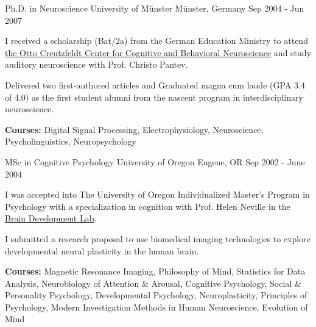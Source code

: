

\begin{cventries}

  \cventry
    {Ph.D. in Neuroscience} %
    {University of Münster} %
    {Münster, Germany} %
    {Sep 2004 - Jun 2007} %
    {
      \begin{cvitems} %
        \item {I received a scholarship (Bat/2a) from the German Education Ministry to attend \href{https://www.uni-muenster.de/OCCMuenster/}{the Otto Creutzfeldt Center for Cognitive and Behavioral Neuroscience} and study auditory neuroscience with Prof. Christo Pantev.}
        \item {Delivered two first-authored articles and Graduated magna cum laude (GPA 3.4 of 4.0) as the first student alumni from the nascent program in interdisciplinary neuroscience.}
        \item {\textbf{Courses:} Digital Signal Processing, Electrophysiology, Neuroscience, Psycholinguistics, Neuropsychology}
      \end{cvitems}
    }
    
  \cventry
    {MSc in Cognitive Psychology} %
    {University of Oregon} %
    {Eugene, OR} %
    {Sep 2002 - June 2004} %
    {
      \begin{cvitems} %
        \item {I was accepted into The University of Oregon Individualized Master's Program in Psychology with a specialization in cognition with Prof. Helen Neville in the \href{https://bdl.uoregon.edu}{Brain Development Lab}.}
        \item {I submitted a research proposal to use biomedical imaging technologies to explore developmental neural plasticity in the human brain.}
        \item {\textbf{Courses:} Magnetic Resonance Imaging, Philosophy of Mind, Statistics for Data Analysis, Neurobiology of Attention \& Arousal, Cognitive Psychology,
        Social \& Personality Psychology, Developmental Psychology, Neuroplasticity, Principles of Psychology, Modern Investigation Methods in Human Neuroscience, Evolution of Mind}
      \end{cvitems}
    }
    

\end{cventries}
